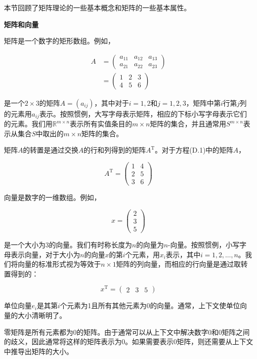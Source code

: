 \documentclass[lang=cn,newtx,10pt,scheme=chinese]{elegantbook}
\begin{document}
本节回顾了矩阵理论的一些基本概念和矩阵的一些基本属性。

\textbf{矩阵和向量}

矩阵是一个数字的矩形数组。例如，

$$
\begin{aligned}
A & =\left(\begin{array}{lll}
a_{11} & a_{12} & a_{13} \\
a_{21} & a_{22} & a_{23}
\end{array}\right) \\
& =\left(\begin{array}{lll}
1 & 2 & 3 \\
4 & 5 & 6
\end{array}\right)
\end{aligned}
$$

是一个$2 \times 3$的矩阵$A=\left(a_{i j}\right)$，其中对于$i=1,2$和$j=1,2,3$，矩阵中第$i$行第$j$列的元素用$a_{i j}$表示。按照惯例，大写字母表示矩阵，相应的下标小写字母表示它们的元素。我们用$\mathbb{R}^{m \times n}$表示所有实值条目的$m \times n$矩阵的集合，并且通常用$S^{m \times n}$表示从集合$S$中取出的$m \times n$矩阵的集合。

矩阵$A$的转置是通过交换$A$的行和列得到的矩阵$A^{\mathrm{T}}$。对于方程(D.1)中的矩阵$A$，

$$
A^{\mathrm{T}}=\left(\begin{array}{ll}
1 & 4 \\
2 & 5 \\
3 & 6
\end{array}\right)
$$

向量是数字的一维数组。例如，

$$
x=\left(\begin{array}{l}
2 \\
3 \\
5
\end{array}\right)
$$

是一个大小为3的向量。我们有时称长度为$n$的向量为$n$-向量。按照惯例，小写字母表示向量，对于大小为$n$的向量$x$的第$i$个元素，用$x_i$表示，其中$i=1,2,\ldots,n$。我们将向量的标准形式视为等效于$n \times 1$矩阵的列向量，而相应的行向量是通过取转置得到的：

$$
x^{\mathrm{T}}=\left(\begin{array}{lll}
2 & 3 & 5
\end{array}\right)
$$

单位向量$e_i$是其第$i$个元素为1且所有其他元素为0的向量。通常，上下文使单位向量的大小清晰明了。

零矩阵是所有元素都为0的矩阵。由于通常可以从上下文中解决数字0和0矩阵之间的歧义，因此通常将这样的矩阵表示为0。如果需要表示0矩阵，则还需要从上下文中推导出矩阵的大小。
\end{document}

